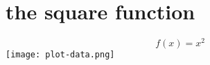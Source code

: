 \documentclass{article}
\begin{document}
\section{the square function} 

\[
    f(x) = x^2  
\]
\texttt{[image: plot-data.png]}
\end{document}

